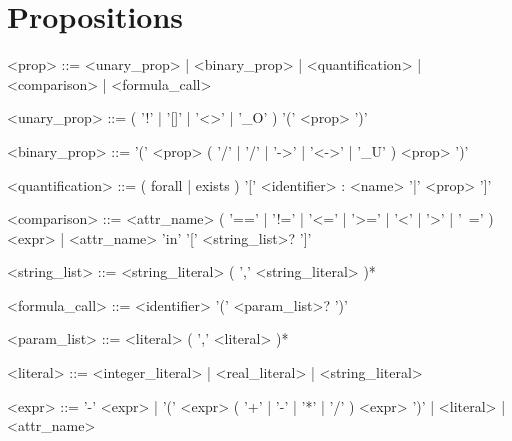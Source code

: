 \section{Propositions}

\begin{ltlcode}
<prop>             ::= <unary_prop> 
                   |   <binary_prop> 
                   |   <quantification> 
                   |   <comparison> 
                   |   <formula_call>

<unary_prop>       ::= ( '!' | '[]' | '<>' | '_O' ) '(' <prop> ')'

<binary_prop>      ::= '(' <prop> ( '/\bs' | '\bs/' | '->' | '<->' | '_U' ) <prop> ')' 

<quantification>   ::= ( forall | exists ) '[' <identifier> : <name> '|' <prop> ']'

<comparison>       ::= <attr_name> 
                       ( '==' | '!=' | '<=' | '>=' | '<' | '>' | '~=' ) 
		       <expr>
                   |   <attr_name> 'in' '[' <string_list>? ']'

<string_list>      ::= <string_literal> ( ',' <string_literal> )*

<formula_call>     ::= <identifier> '(' <param_list>? ')'

<param_list>       ::= <literal> ( ',' <literal> )*

<literal>          ::= <integer_literal> | <real_literal> | <string_literal> 

<expr>             ::= '-' <expr>
                   |   '(' <expr> ( '+' | '-' | '*' | '/' ) <expr> ')'
                   |   <literal>
                   |   <attr_name>
\end{ltlcode}
